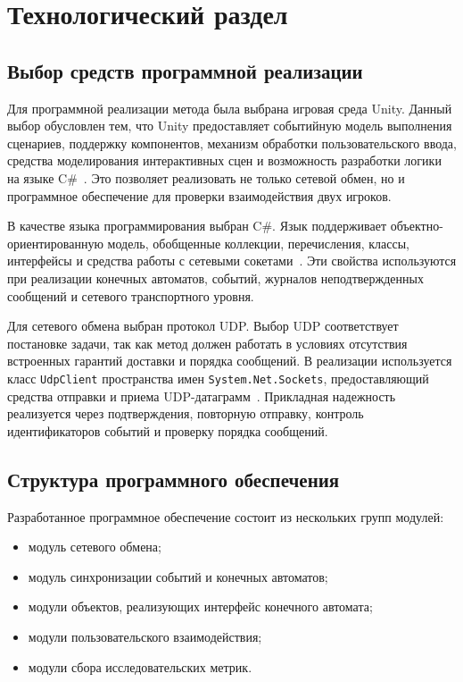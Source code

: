 ﻿\chapter{Технологический раздел}\label{implementation}

\section{Выбор средств программной реализации}

Для программной реализации метода была выбрана игровая среда Unity. Данный выбор обусловлен тем, что Unity предоставляет событийную модель выполнения сценариев, поддержку компонентов, механизм обработки пользовательского ввода, средства моделирования интерактивных сцен и возможность разработки логики на языке C\#~\cite{unity_monobehaviour}. Это позволяет реализовать не только сетевой обмен, но и программное обеспечение для проверки взаимодействия двух игроков.

В качестве языка программирования выбран C\#. Язык поддерживает объектно-ориентированную модель, обобщенные коллекции, перечисления, классы, интерфейсы и средства работы с сетевыми сокетами~\cite{csharp_reference}. Эти свойства используются при реализации конечных автоматов, событий, журналов неподтвержденных сообщений и сетевого транспортного уровня.

Для сетевого обмена выбран протокол UDP. Выбор UDP соответствует постановке задачи, так как метод должен работать в условиях отсутствия встроенных гарантий доставки и порядка сообщений. 
В реализации используется класс \texttt{UdpClient} пространства имен \texttt{System.Net.Sockets}, предоставляющий средства отправки и приема UDP-датаграмм~\cite{dotnet_udpclient}. 
Прикладная надежность реализуется через подтверждения, повторную отправку, контроль идентификаторов событий и проверку порядка сообщений.

\section{Структура программного обеспечения}

Разработанное программное обеспечение состоит из нескольких групп модулей:
\begin{itemize}
	\item модуль сетевого обмена;
	\item модуль синхронизации событий и конечных автоматов;
	\item модули объектов, реализующих интерфейс конечного автомата;
	\item модули пользовательского взаимодействия;
	\item модули сбора исследовательских метрик.
\end{itemize}

